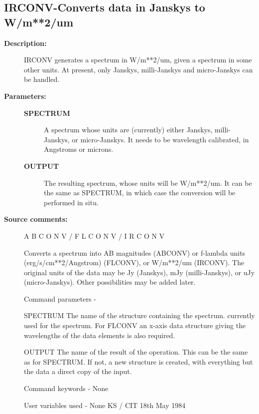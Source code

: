 \begin{description}
\subsection{IRCONV-\label{IRCONV}Converts data in Janskys to W/m**2/um}
\begin{description}

\item [\textbf{Description:}]
 IRCONV generates a spectrum in W/m**2/um, given a spectrum
 in some other units.  At present, only Janskys, milli-Janskys and
 micro-Janskys can be handled.

\item [\textbf{Parameters:}]
\begin{description}
\item [\textbf{SPECTRUM}]
 A spectrum whose units are (currently) either Janskys,
 milli-Janskys, or micro-Janskys.  It needs to be
 wavelength calibrated, in Angstroms or microns.
\item [\textbf{OUTPUT}]
 The resulting spectrum, whose units will be
 W/m**2/um. It can be the same as SPECTRUM, in which
 case the conversion will be performed in situ.
\end{description}

\item [\textbf{Source comments:}]
\begin{terminalv}
 A B C O N V  /  F L C O N V  /  I R C O N V

 Converts a spectrum into AB magnitudes (ABCONV) or f-lambda
 units (erg/s/cm**2/Angstrom) (FLCONV), or W/m**2/um (IRCONV).
 The original units of the data may be Jy (Janskys), mJy
 (milli-Janskys), or uJy (micro-Janskys). Other possibilities
 may be added later.

 Command parameters -

 SPECTRUM The name of the structure containing the spectrum.
          currently used for the spectrum.  For FLCONV
          an x-axis data structure giving the wavelengths of the
          data elements is also required.

 OUTPUT   The name of the result of the operation.  This can
          be the same as for SPECTRUM. If not, a new structure
          is created, with everything but the data a direct
          copy of the input.

 Command keywords  - None

 User variables used - None
                                  KS / CIT 18th May 1984
\end{terminalv}
\end{description}

\end{description}
